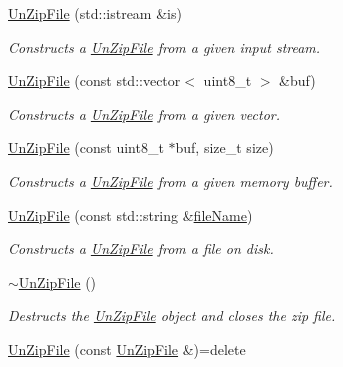 \begin{DoxyCompactItemize}
\item 
\hyperlink{group___utility_module_gac32fa3973017fa76647d90ab64bbceae}{Un\+Zip\+File} (std\+::istream \&is)
\begin{DoxyCompactList}\small\item\em Constructs a \hyperlink{classdg_1_1deepcore_1_1_un_zip_file}{Un\+Zip\+File} from a given input stream. \end{DoxyCompactList}\item 
\hyperlink{group___utility_module_ga64e2c80586cc8429067c15ab1fa39e08}{Un\+Zip\+File} (const std\+::vector$<$ uint8\+\_\+t $>$ \&buf)
\begin{DoxyCompactList}\small\item\em Constructs a \hyperlink{classdg_1_1deepcore_1_1_un_zip_file}{Un\+Zip\+File} from a given vector. \end{DoxyCompactList}\item 
\hyperlink{group___utility_module_ga1efd284e3fbbef3d57a598c47a7cc73b}{Un\+Zip\+File} (const uint8\+\_\+t $\ast$buf, size\+\_\+t size)
\begin{DoxyCompactList}\small\item\em Constructs a \hyperlink{classdg_1_1deepcore_1_1_un_zip_file}{Un\+Zip\+File} from a given memory buffer. \end{DoxyCompactList}\item 
\hyperlink{group___utility_module_ga4418028e98c6031359ace40625987864}{Un\+Zip\+File} (const std\+::string \&\hyperlink{group___utility_module_ga4c5433ff98fc88ebe244871a16660e0f}{file\+Name})
\begin{DoxyCompactList}\small\item\em Constructs a \hyperlink{classdg_1_1deepcore_1_1_un_zip_file}{Un\+Zip\+File} from a file on disk. \end{DoxyCompactList}\item 
\hyperlink{group___utility_module_ga325131b751ccc5a391367afb09084036}{$\sim$\+Un\+Zip\+File} ()
\begin{DoxyCompactList}\small\item\em Destructs the \hyperlink{classdg_1_1deepcore_1_1_un_zip_file}{Un\+Zip\+File} object and closes the zip file. \end{DoxyCompactList}\item 
\hyperlink{classdg_1_1deepcore_1_1_un_zip_file_a1c1da90565db56d9d8eed0f10a8a8b2e}{Un\+Zip\+File} (const \hyperlink{classdg_1_1deepcore_1_1_un_zip_file}{Un\+Zip\+File} \&)=delete
\item 

\end{DoxyCompactItemize}
